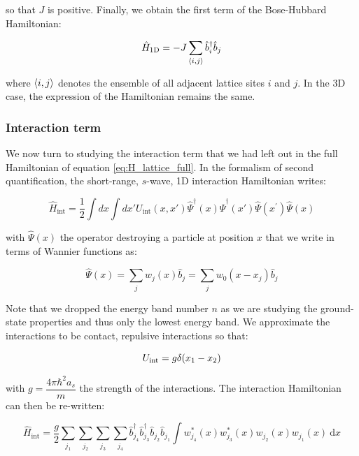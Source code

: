 \noindent so that $J$ is positive. Finally, we obtain the first term of the Bose-Hubbard Hamiltonian:

\begin{equation}
    \hat{H}_{\rm{1D}} = -J \sum_{\left\langle i,j\right\rangle} \hat{b}^{\dagger}_i \hat{b}_j
    \label{eq:H_band}
\end{equation}

\noindent where $\left\langle i,j\right\rangle$ denotes the ensemble of all adjacent lattice sites $i$ and $j$. In the 3D case, the expression of the Hamiltonian remains the same.

\subsubsection{Interaction term}
We now turn to studying the interaction term that we had left out in the full Hamiltonian of equation \ref{eq:H_lattice_full}. In the formalism of second quantification, the short-range, $s$-wave, 1D interaction Hamiltonian writes:

\begin{equation}
    \hat{H}_{\mathrm{int}}=\frac{1}{2} \int d x \int d x' U_{\mathrm{int}}\left(x, x'\right) \hat{\Psi}^{\dagger}(x) \hat{\Psi}^{\dagger}\left(x'\right) \hat{\Psi}\left(x^{\prime}\right) \hat{\Psi}(x)
\end{equation}

\noindent with $\hat{\Psi}(x)$ the operator destroying a particle at position $x$ that we write in terms of Wannier functions as:

\begin{equation}
    \hat{\Psi}(x)=\sum_{j} w_{j}(x) \hat{b}_{j} = \sum_{j} w_{0}(x-x_j) \hat{b}_{j} 
    \label{eq:atom_operator_lattice}
\end{equation}

\noindent Note that we dropped the energy band number $n$ as we are studying the ground-state properties and thus only the lowest energy band. We approximate the interactions to be contact, repulsive interactions so that:

\begin{equation}
    U_{\rm{int}}= g \delta (x_1 - x_2)
\end{equation}

\noindent with $g=\dfrac{4 \pi \hbar^2 a_s}{m}$ the strength of the interactions. The interaction Hamiltonian can then be re-written:

\begin{equation}
    \hat{H}_{\mathrm{int}}=\frac{g}{2} \sum_{j_{1}} \sum_{j_{2}} \sum_{j_{3}} \sum_{j_{4}} \hat{b}_{j_{4}}^{\dagger} \hat{b}_{j_{3}}^{\dagger} \hat{b}_{j_{2}} \hat{b}_{j_{1}} \int w_{j_{4}}^{*}(x) w_{j_{3}}^{*}(x) w_{j_{2}}(x) w_{j_{1}}(x) \mathrm{~d} x
    \label{eq:h_int_intermediate}
\end{equation}

